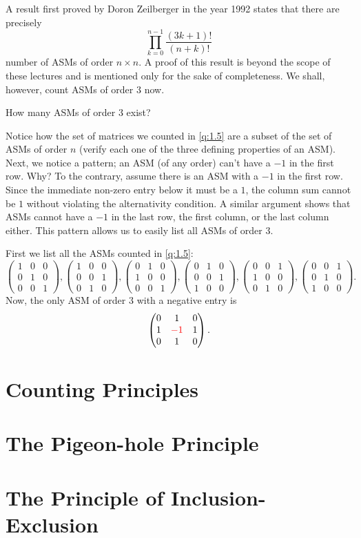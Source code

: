 A result first proved by Doron Zeilberger in the year 1992 states that there are precisely  \[
\prod_{k=0}^{n-1} \frac{\left( 3k+1 \right)!}{\left( n+k \right)!}
\] 
number of ASMs of order $n\times n$. A proof of this result is beyond the scope of these lectures and is mentioned only for the sake of completeness. We shall, however, count ASMs of order $3$ now.

\begin{question}
    How many ASMs of order $3$ exist?
\end{question}
Notice how the set of matrices we counted in \cref{q:1.5} are a subset of the set of ASMs of order $n$ (verify each one of the three defining properties of an ASM). Next, we notice a pattern; an ASM (of any order) can't have a $-1$ in the first row. Why? To the contrary, assume there is an ASM with a $-1$ in the first row. Since the immediate non-zero entry below it must be a $1$, the column sum cannot be $1$ without violating the alternativity condition. A similar argument shows that ASMs cannot have a 
$-1$ in the last row, the first column, or the last column either. This pattern allows us to easily list all ASMs of order $3$.

First we list all the ASMs counted in \cref{q:1.5}:
\[
\begin{pmatrix}
    1 & 0 & 0 \\
    0 & 1 & 0 \\
    0 & 0 & 1
\end{pmatrix},
\begin{pmatrix}
    1 & 0 & 0 \\
    0 & 0 & 1 \\
    0 & 1 & 0
\end{pmatrix},
\begin{pmatrix}
    0 & 1 & 0 \\
    1 & 0 & 0 \\
    0 & 0 & 1
\end{pmatrix},
\begin{pmatrix}
    0 & 1 & 0 \\
    0 & 0 & 1 \\
    1 & 0 & 0
\end{pmatrix},
\begin{pmatrix}
    0 & 0 & 1 \\
    1 & 0 & 0 \\
    0 & 1 & 0
\end{pmatrix},
\begin{pmatrix}
    0 & 0 & 1 \\
    0 & 1 & 0 \\
    1 & 0 & 0
\end{pmatrix}.
\]
Now, the only ASM of order $3$ with a negative entry is
\[
\begin{pmatrix}
    0 & 1 & 0 \\
    1 & \textcolor{red}{-1} & 1 \\
    0 & 1 & 0
\end{pmatrix}.
\]

\section{Counting Principles}
\section{The Pigeon-hole Principle}
\section{The Principle of Inclusion-Exclusion}